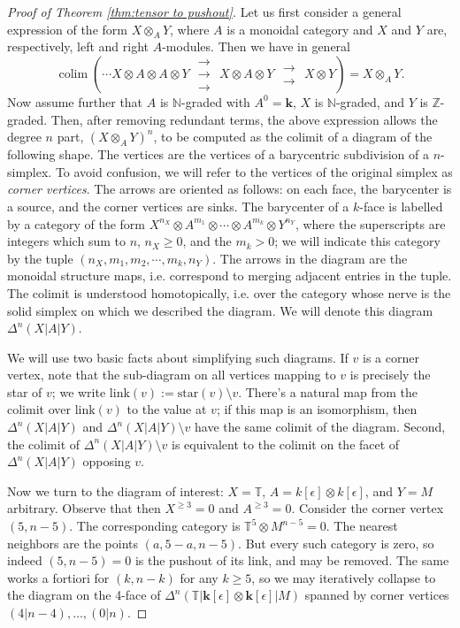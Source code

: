 \documentclass{article}
\def\Z{\mathbb{Z}}
\def\N{\mathbb{N}}
\DeclareMathOperator{\colim}{colim}
\theoremstyle{definition}
\begin{document}
\begin{proof}[Proof of Theorem \ref{thm:tensor to pushout}]
    Let us first consider a general expression of the form $X \otimes_A Y$, where 
    $A$ is a monoidal category and $X$ and $Y$ are, respectively, left and right $A$-modules.  Then 
    we have in general 
    $$  \colim \left( \cdots X \otimes A \otimes A \otimes Y   \,\, \substack{\rightarrow\\[-.6ex] \rightarrow \\[-.6ex] \rightarrow}   \,\, X \otimes A \otimes Y  \,\, \substack{\rightarrow\\[-.6ex] \rightarrow } \,\, X \otimes Y \right) = X \otimes_A Y.$$
    Now assume further that $A$ is $\N$-graded with $A^0 = \mathbf{k}$, $X$ is $\N$-graded, and $Y$ is $\Z$-graded.    Then, after removing redundant terms, 
    the above expression allows the degree $n$ part, $(X \otimes_A Y)^n$, to be computed as the colimit of a diagram of the following shape.   The vertices are the vertices of a barycentric subdivision of a $n$-simplex. To avoid confusion, we will refer to the vertices of the original simplex as {\em corner vertices}.  The arrows are oriented as follows: on each face, the barycenter is a source, and the corner vertices are sinks.  The barycenter of a $k$-face is labelled by a category of the form $X^{n_X} \otimes A^{m_1} \otimes \cdots \otimes A^{m_k} \otimes Y^{n_Y}$, where the superscripts are integers which sum to $n$, $n_X \ge 0$, and the $m_k > 0$;  we will indicate this category by the tuple $(n_X, m_1, m_2, \cdots, m_k, n_Y)$.  The arrows in the diagram are the monoidal structure maps, i.e. correspond to merging adjacent entries in the tuple.  The colimit is understood homotopically, i.e. over the category whose nerve is the solid simplex on which we described the diagram.  We will denote this diagram $\Delta^n(X|A|Y)$.

    We will use two basic facts about simplifying such diagrams.  If $v$ is a corner vertex, note that the sub-diagram on all vertices mapping to $v$ is precisely the star of $v$; we write $\mathrm{link}(v) := \mathrm{star}(v) \setminus v$.  There's a natural map from the colimit over $\mathrm{link}(v)$ to the value at $v$; if this map is an isomorphism, then $\Delta^n(X|A|Y)$ and $\Delta^n(X|A|Y) \setminus v$ have the same colimit of the diagram.    Second,  the colimit of $\Delta^n(X|A|Y) \setminus v$ is equivalent to the colimit on the facet of $\Delta^n(X|A|Y)$ opposing $v$. 

    Now we turn to the diagram of interest: $X = \mathbb{T}$, $A= k[\epsilon] \otimes k[\epsilon]$, and $Y = M$ arbitrary.  Observe that then $X^{\ge 3} = 0$ and $A^{\ge 3} = 0$.  Consider the corner vertex $(5,n-5)$.  The corresponding category is $\mathbb{T}^5 \otimes M^{n-5} = 0$.  The nearest neighbors are the points $(a, 5-a, n-5)$.  But every such category is zero, so indeed $(5,n-5)=0$ is the pushout of its link, and may be removed.  The same works a fortiori for $(k, n-k)$ for any $k\ge 5$, so we may iteratively collapse to the diagram on the 4-face of $\Delta^n(\mathbb{T}|\mathbf{k}[\epsilon] \otimes \mathbf{k}[\epsilon]|M)$ spanned by corner vertices $(4|n-4), \ldots, (0|n)$.  
    

\end{proof}
\end{document}
